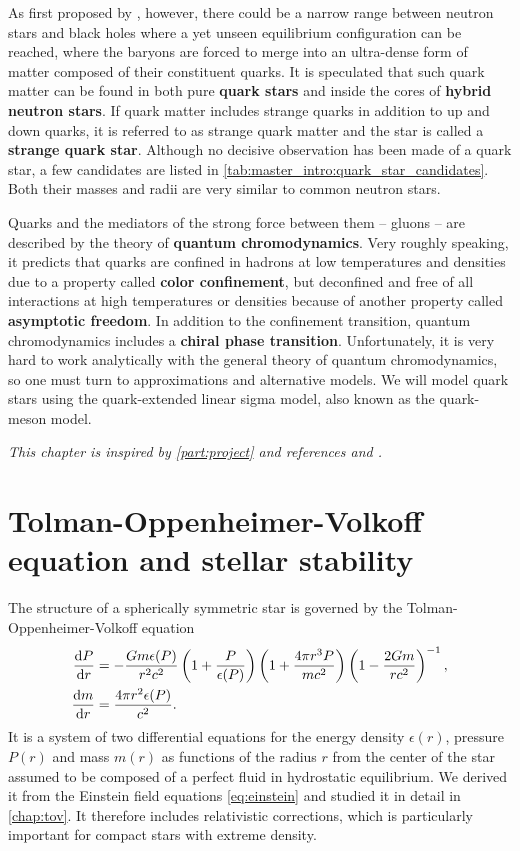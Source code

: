 As first proposed by \cite{ref:quark_star_proposition_1}, however,
there could be a narrow range between neutron stars and black holes where a yet unseen equilibrium configuration can be reached,
where the baryons are forced to merge into an ultra-dense form of matter composed of their constituent quarks.
It is speculated that such quark matter can be found in both pure \textbf{quark stars} and inside the cores of \textbf{hybrid neutron stars}.
If quark matter includes strange quarks in addition to up and down quarks, it is referred to as strange quark matter and the star is called a \textbf{strange quark star}.
Although no decisive observation has been made of a quark star,
a few candidates are listed in \cref{tab:master_intro:quark_star_candidates}.
Both their masses and radii are very similar to common neutron stars.

Quarks and the mediators of the strong force between them -- gluons -- are described by the theory of \textbf{quantum chromodynamics}.
Very roughly speaking, it predicts that quarks are confined in hadrons at low temperatures and densities due to a property called \textbf{color confinement},
but deconfined and free of all interactions at high temperatures or densities because of another property called \textbf{asymptotic freedom}.
In addition to the confinement transition, quantum chromodynamics includes a \textbf{chiral phase transition}.
Unfortunately, it is very hard to work analytically with the general theory of quantum chromodynamics,
so one must turn to approximations and alternative models.
We will model quark stars using the quark-extended linear sigma model, also known as the quark-meson model.

\textit{This chapter is inspired by \cref{part:project} and references \cite{ref:glendenning} and \cite{ref:schwartz}.}

\section{Tolman-Oppenheimer-Volkoff equation and stellar stability}
\label{sec:master_intro:tov}

The structure of a spherically symmetric star is governed by the Tolman-Oppenheimer-Volkoff equation
\begin{subequations}
\begin{align}
	\odv{P}{r} &= -\frac{G m \epsilon(P)}{r^2 c^2} \left( 1 + \frac{P}{\epsilon(P)} \right) \left( 1 + \frac{4 \pi r^3 P}{m c^2} \right) \left( 1 - \frac{2 G m}{r c^2} \right)^{-1} , \\
	\odv{m}{r} &= \frac{4 \pi r^2 \epsilon(P)}{c^2} .
\end{align}%
\label{eq:master_intro:tov}%
\end{subequations}%
It is a system of two differential equations for the energy density $\epsilon(r)$, pressure $P(r)$ and mass $m(r)$ as functions of the radius $r$ from the center of the star assumed to be composed of a perfect fluid in hydrostatic equilibrium.
We derived it from the Einstein field equations \eqref{eq:einstein} and studied it in detail in \cref{chap:tov}.
It therefore includes relativistic corrections, which is particularly important for compact stars with extreme density.

